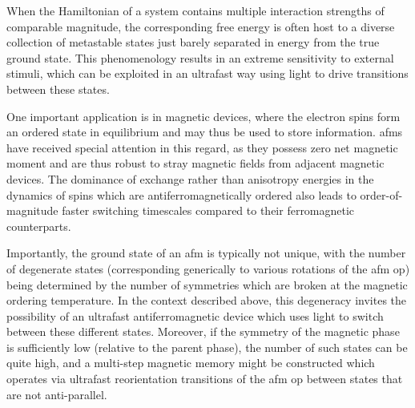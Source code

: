 When the Hamiltonian of a system contains multiple interaction strengths of comparable magnitude, the corresponding free energy is often host to a diverse collection of metastable states just barely separated in energy from the true ground state.
This phenomenology results in an extreme sensitivity to external stimuli\citep{zhang_dynamics_2014,basov_electrodynamics_2011,dagotto_complexity_2005}, which can be exploited in an ultrafast way using light to drive transitions between these states\citep{basov_towards_2017,kogar_light-induced_2020,mitrano_possible_2016,fausti_light-induced_2011}.

One important application is in magnetic devices, where the electron spins form an ordered state in equilibrium and may thus be used to store information.
\Glspl{afm} have received special attention in this regard, as they possess zero net magnetic moment and are thus robust to stray magnetic fields from adjacent magnetic devices\citep{jungwirth_antiferromagnetic_2016}.
The dominance of exchange rather than anisotropy energies in the dynamics of spins which are antiferromagnetically ordered also leads to order-of-magnitude faster switching timescales compared to their ferromagnetic counterparts\citep{nemec_antiferromagnetic_2018}.

Importantly, the ground state of an \gls{afm} is typically not unique, with the number of degenerate states (corresponding generically to various rotations of the \gls{afm} \gls{op}) being determined by the number of symmetries which are broken at the magnetic ordering temperature.
In the context described above, this degeneracy invites the possibility of an ultrafast antiferromagnetic device which uses light to switch between these different states.
Moreover, if the symmetry of the magnetic phase is sufficiently low (relative to the parent phase), the number of such states can be quite high, and a multi-step magnetic memory might be constructed which operates via ultrafast reorientation transitions of the \gls{afm} \gls{op} between states that are not anti-parallel.

